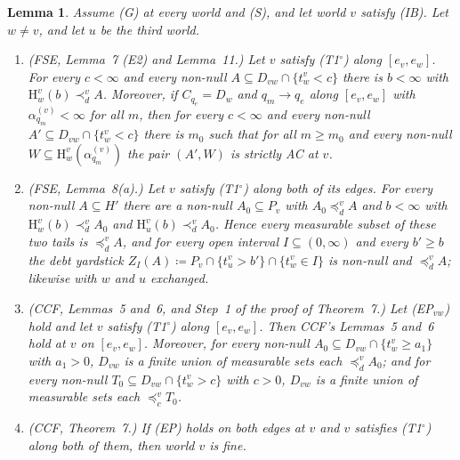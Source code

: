 \documentclass[11pt]{article}
\newtheorem{lemma}[theorem]{Lemma}
\theoremstyle{definition}\newtheorem{definition}[theorem]{Definition}
\theoremstyle{remark}\newtheorem{remark}[theorem]{Remark}
\newcommand{\Hi}[3]{\mathrm H^{#1}_{#2}(#3)}
\newcommand{\To}{\textup{(T1$^\circ$)}}
\begin{document}
\begin{lemma}\label{lem:T1otools}
Assume (G) at every world and (S), and let world $v$ satisfy (IB). Let
$w\ne v$, and let $u$ be the third world.
\begin{enumerate}[label=(\alph*),leftmargin=*,itemsep=2pt]
\item \emph{(FSE, Lemma~7 (E2) and Lemma~11.)} Let $v$ satisfy \To{} along
$[e_v,e_w]$. For every $c<\infty$ and every non-null $A\subseteq
D_{vw}\cap\{t^v_w<c\}$ there is $b<\infty$ with $\Hi vwb\prec^v_dA$.
Moreover, if $C_{q_e}=D_w$ and $q_m\to q_e$ along $[e_v,e_w]$ with
$\alpha^{(v)}_{q_m}<\infty$ for all $m$, then for every $c<\infty$ and every
non-null $A'\subseteq D_{vw}\cap\{t^v_w<c\}$ there is $m_0$ such that for
all $m\ge m_0$ and every non-null $W\subseteq\Hi vw{\alpha^{(v)}_{q_m}}$ the
pair $(A',W)$ is strictly AC at $v$.
\item \emph{(FSE, Lemma~8(a).)} Let $v$ satisfy \To{} along both of its
edges. For every non-null $A\subseteq H'$ there are a non-null
$A_0\subseteq P_v$ with $A_0\preceq^v_dA$ and $b<\infty$ with $\Hi
vwb\prec^v_dA_0$ and $\Hi vub\prec^v_dA_0$. Hence every measurable subset of
these two tails is $\preceq^v_dA$, and for every open interval
$I\subseteq(0,\infty)$ and every $b'\ge b$ the \emph{debt yardstick}
$Z_I(A)\coloneqq P_v\cap\{t^v_u>b'\}\cap\{t^v_w\in I\}$ is non-null and
$\preceq^v_dA$; likewise with $w$ and $u$ exchanged.
\item \emph{(CCF, Lemmas~5 and~6, and Step~1 of the proof of Theorem~7.)}
Let (EP$_{vw}$) hold and let $v$ satisfy \To{} along $[e_v,e_w]$. Then
CCF's Lemmas~5 and~6 hold at $v$ on $[e_v,e_w]$. Moreover, for every
non-null $A_0\subseteq D_{vw}\cap\{t^v_w\ge a_1\}$ with $a_1>0$, $D_{vw}$ is
a finite union of measurable sets each $\preceq^v_dA_0$; and for every
non-null $T_0\subseteq D_{vw}\cap\{t^v_w>c\}$ with $c>0$, $D_{vw}$ is a
finite union of measurable sets each $\preceq^v_cT_0$.
\item \emph{(CCF, Theorem~7.)} If (EP) holds on both edges at $v$ and $v$
satisfies \To{} along both of them, then world $v$ is fine.
\end{enumerate}
\end{lemma}
\end{document}
